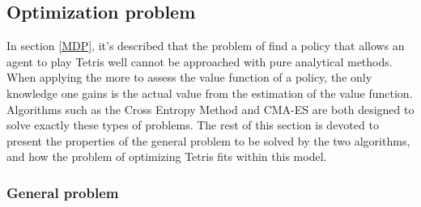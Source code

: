 \subsection{Optimization problem}

In section \ref{MDP}, it's described that the problem of
find a policy that allows an agent to play Tetris well
cannot be approached with pure analytical methods.
When applying the more%
to assess the value function of a policy, the only 
knowledge one gains is the actual value from the estimation 
of the value function. Algorithms such as the Cross Entropy Method
and CMA-ES are both designed to solve exactly these types of problems.
The rest of this section is devoted to present the properties of the 
general problem to be solved by the two algorithms, and how the 
problem of optimizing Tetris fits within this model.

\subsubsection{General problem \label{ProblemFormulation}}

